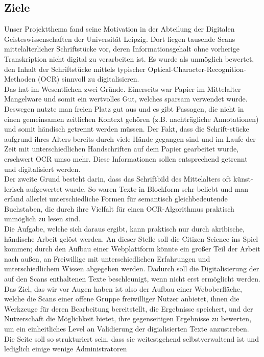 \documentclass{article}
\begin{document}
\subsection{Ziele}
Unser Projektthema fand seine Motivation in der Abteilung der Digitalen Geisteswissenschaften der Universität Leipzig.
Dort liegen tausende Scans mittelalterlicher Schriftstücke vor, deren Informationsgehalt ohne vorherige Transkription nicht digital zu verarbeiten ist.
Es wurde als unmöglich bewertet, den Inhalt der Schriftstücke mittels typischer Optical-Character-Recognition-Methoden (OCR) sinnvoll zu digitalisieren.\\
Das hat im Wesentlichen zwei Gründe.
Einerseits war Papier im Mittelalter Mangelware und somit ein wertvolles Gut, welches sparsam verwendet wurde.
Deswegen nutzte man freien Platz gut aus und es gibt Passagen,
die nicht in einen gemeinsamen zeitlichen Kontext gehören (z.B. nachträgliche Annotationen) und somit händisch getrennt werden müssen.
Der Fakt, dass die Schrift-stücke aufgrund ihres Alters bereits durch viele Hände gegangen sind und im Laufe der Zeit
mit unterschiedlichen Handschriften auf dem Papier gearbeitet wurde, erschwert OCR umso mehr.
Diese Informationen sollen entsprechend getrennt und digitalisiert werden.\\
Der zweite Grund besteht darin, dass das Schriftbild des Mittelalters oft künst-lerisch aufgewertet wurde.
So waren Texte in Blockform sehr beliebt und man erfand allerlei unterschiedliche Formen für semantisch gleichbedeutende Buchstaben,
die durch ihre Vielfalt für einen OCR-Algorithmus praktisch unmöglich zu lesen sind.\\
Die Aufgabe, welche sich daraus ergibt, kann praktisch nur durch akribische, händische Arbeit gelöst werden.
An dieser Stelle soll die Citizen Science ins Spiel kommen; durch den Aufbau einer Webplattform könnte ein großer Teil der Arbeit nach außen,
an Freiwillige mit unterschiedlichen Erfahrungen und unterschiedlichem Wissen abgegeben werden.
Dadurch soll die Digitalisierung der auf den Scans enthaltenen Texte beschleunigt, wenn nicht erst ermöglicht werden.\\
Das Ziel, das wir vor Augen haben ist also der Aufbau einer Weboberfläche, welche die Scans einer offene Gruppe freiwilliger Nutzer anbietet,
ihnen die Werkzeuge für deren Bearbeitung bereitstellt, die Ergebnisse speichert, und der Nutzerschaft die Möglichkeit bietet,
ihre gegenseitigen Ergebnisse zu bewerten, um ein einheitliches Level an Validierung der digialisierten Texte anzustreben.
Die Seite soll so strukturiert sein, dass sie weitestgehend selbstverwaltend ist und lediglich einige wenige Administratoren
\end{document}
